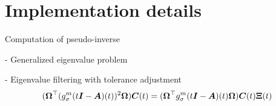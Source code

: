 %


\section{Implementation details}
\label{sec:3-nystrom-implementation-details}

Computation of pseudo-inverse

- Generalized eigenvalue problem

- Eigenvalue filtering with tolerance adjustment
\begin{equation}
    (\boldsymbol{\Omega}^{\top} (g_{\sigma}^m(t\boldsymbol{I} - \boldsymbol{A})(t))^2 \boldsymbol{\Omega}) \boldsymbol{C}(t) = (\boldsymbol{\Omega}^{\top} g_{\sigma}^m(t\boldsymbol{I} - \boldsymbol{A})(t) \boldsymbol{\Omega}) \boldsymbol{C}(t) \boldsymbol{\Xi}(t)
    \label{equ:3-nystrom-generalized-eigenproblem}
\end{equation}

